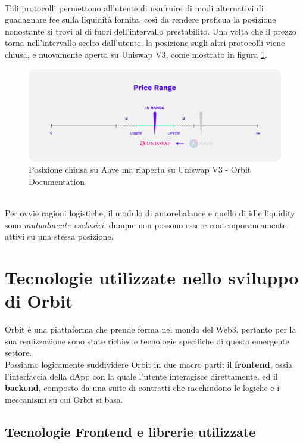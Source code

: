 \documentclass[12pt,a4paper]{report}
\begin{document}
\noindent \\Tali protocolli permettono all'utente di usufruire di modi alternativi di guadagnare fee sulla liquidità fornita, così da rendere proficua la posizione nonostante si trovi al di fuori dell'intervallo prestabilito.
Una volta che il prezzo torna nell'intervallo scelto dall'utente, la posizione sugli altri protocolli viene chiusa, e nuovamente aperta su Uniswap V3, come mostrato in figura \ref{fig:uniswap_back}.

\begin{figure}[H]
  \includegraphics[scale=0.3]{uniswap_back.png}
  \centering
  \caption{Posizione chiusa su Aave ma riaperta su Uniswap V3 - Orbit Documentation}
  \label{fig:uniswap_back}
\end{figure}

\noindent \\Per ovvie ragioni logistiche, il modulo di autorebalance e quello di idle liquidity sono \textit{mutualmente esclusivi}, dunque non possono essere contemporaneamente attivi su una stessa posizione.
\chapter{Tecnologie utilizzate nello sviluppo di Orbit}

Orbit è una piattaforma che prende forma nel mondo del Web3, pertanto per la sua realizzazione sono state richieste tecnologie specifiche di questo emergente settore.
\\Possiamo logicamente suddividere Orbit in due macro parti: il \textbf{frontend}, ossia l'interfaccia della dApp\cite{orbit_website} con la quale l'utente interagisce direttamente, ed il \textbf{backend}, composto da una suite di contratti che racchiudono le logiche e i meccanismi su cui Orbit si basa.

\section{Tecnologie Frontend e librerie utilizzate}
\end{document}

